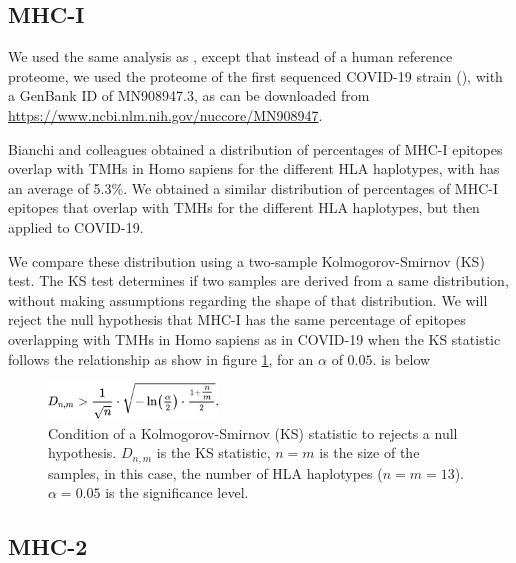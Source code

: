 \documentclass{article}
\begin{document}
\subsection{MHC-I}

We used the same analysis as \cite{bianchi2017},
except that instead of a human reference proteome,
we used the proteome of the first sequenced COVID-19 strain (\cite{wu2020new}),
with a GenBank ID of MN908947.3, as can be downloaded 
from \url{https://www.ncbi.nlm.nih.gov/nuccore/MN908947}.

Bianchi and colleagues obtained a distribution of 
percentages of MHC-I epitopes overlap with TMHs in Homo sapiens
for the different HLA haplotypes, with has an average of 5.3\%.
We obtained a similar distribution of percentages of MHC-I epitopes that 
overlap with TMHs for the different HLA haplotypes, but then applied to
COVID-19.

We compare these distribution using a two-sample 
Kolmogorov-Smirnov (KS) test. The KS test determines if two samples
are derived from a same distribution, without making assumptions
regarding the shape of that distribution. We will reject
the null hypothesis that MHC-I has the same percentage of epitopes 
overlapping with TMHs in Homo sapiens as in COVID-19 when 
the KS statistic follows the relationship as show in 
figure \ref{fig:ks}, for an $\alpha$ of $0.05$.
is below 

\begin{figure}[!htbp]
  \includegraphics[width=0.4\textwidth]{pics/ks.png}
  \caption{
    Condition of a Kolmogorov-Smirnov (KS) statistic to rejects a null
    hypothesis. $D_{n,m}$ is the KS statistic, $n = m$ is the size
    of the samples, in this case, the number of HLA haplotypes ($n = m = 13$).
    $\alpha = 0.05$ is the significance level.
  }
  \label{fig:ks}
\end{figure}

\subsection{MHC-2}
\end{document}
